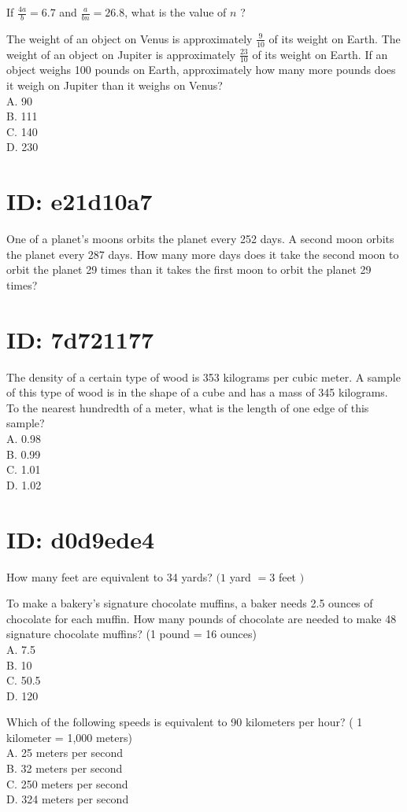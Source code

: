 If $\frac{4 a}{b}=6.7$ and $\frac{a}{b n}=26.8$, what is the value of $n$ ?

The weight of an object on Venus is approximately $\frac{9}{10}$ of its weight on Earth. The weight of an object on Jupiter is approximately $\frac{23}{10}$ of its weight on Earth. If an object weighs 100 pounds on Earth, approximately how many more pounds does it weigh on Jupiter than it weighs on Venus?\\
A. 90\\
B. 111\\
C. 140\\
D. 230

\section*{ID: e21d10a7}
One of a planet's moons orbits the planet every 252 days. A second moon orbits the planet every 287 days. How many more days does it take the second moon to orbit the planet 29 times than it takes the first moon to orbit the planet 29 times?

\section*{ID: 7d721177}
The density of a certain type of wood is 353 kilograms per cubic meter. A sample of this type of wood is in the shape of a cube and has a mass of 345 kilograms. To the nearest hundredth of a meter, what is the length of one edge of this sample?\\
A. 0.98\\
B. 0.99\\
C. 1.01\\
D. 1.02

\section*{ID: d0d9ede4}
How many feet are equivalent to 34 yards? $(1$ yard $=3$ feet $)$

To make a bakery's signature chocolate muffins, a baker needs 2.5 ounces of chocolate for each muffin. How many pounds of chocolate are needed to make 48 signature chocolate muffins? (1 pound = 16 ounces)\\
A. 7.5\\
B. 10\\
C. 50.5\\
D. 120

Which of the following speeds is equivalent to 90 kilometers per hour? ( 1 kilometer = 1,000 meters)\\
A. 25 meters per second\\
B. 32 meters per second\\
C. 250 meters per second\\
D. 324 meters per second

